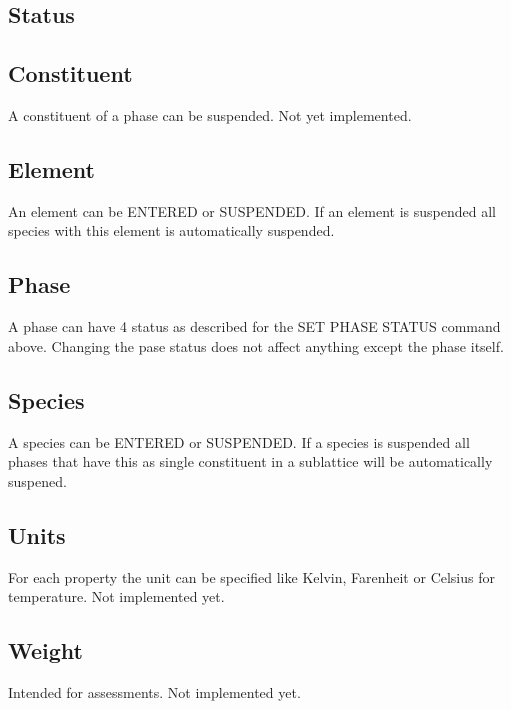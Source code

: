 \documentclass[12pt]{article}
\begin{document}
\subsection{Status}

\subsection{Constituent}

A constituent of a phase can be suspended.  Not yet implemented.

\subsection{Element}

An element can be ENTERED or SUSPENDED.  If an element is suspended
all species with this element is automatically suspended.

\subsection{Phase}

A phase can have 4 status as described for the SET PHASE STATUS
command above.  Changing the pase status does not affect anything
except the phase itself.

\subsection{Species}

A species can be ENTERED or SUSPENDED.  If a species is suspended
all phases that have this as single constituent in a sublattice
will be automatically suspened.

\subsection{Units}

For each property the unit can be specified like Kelvin, Farenheit or
Celsius for temperature.  Not implemented yet.

\subsection{Weight}

Intended for assessments.  Not implemented yet.
\end{document}
